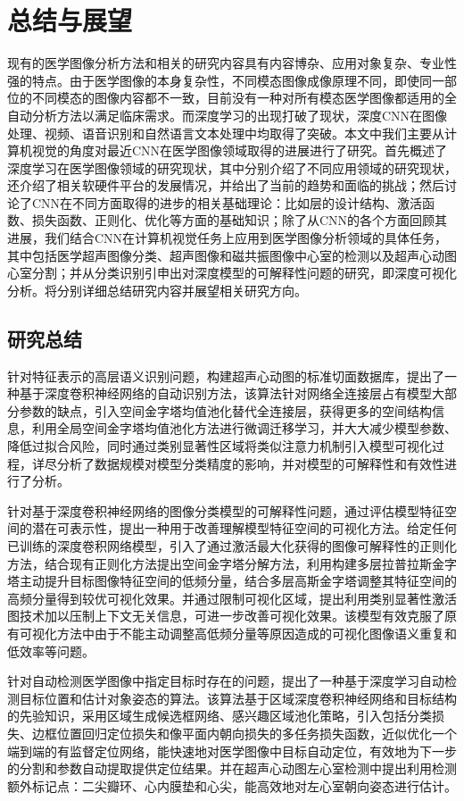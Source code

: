 \chapter{总结与展望}
\label{chap:Sum}

现有的医学图像分析方法和相关的研究内容具有内容博杂、应用对象复杂、专业性强的特点。由于医学图像的本身复杂性，不同模态图像成像原理不同，即使同一部位的不同模态的图像内容都不一致，目前没有一种对所有模态医学图像都适用的全自动分析方法以满足临床需求。而深度学习的出现打破了现状，深度CNN在图像处理、视频、语音识别和自然语言文本处理中均取得了突破。本文中我们主要从计算机视觉的角度对最近CNN在医学图像领域取得的进展进行了研究。首先概述了深度学习在医学图像领域的研究现状，其中分别介绍了不同应用领域的研究现状，还介绍了相关软硬件平台的发展情况，并给出了当前的趋势和面临的挑战；然后讨论了CNN在不同方面取得的进步的相关基础理论：比如层的设计结构、激活函数、损失函数、正则化、优化等方面的基础知识；除了从CNN的各个方面回顾其进展，我们结合CNN在计算机视觉任务上应用到医学图像分析领域的具体任务，其中包括医学超声图像分类、超声图像和磁共振图像中心室的检测以及超声心动图心室分割；并从分类识别引申出对深度模型的可解释性问题的研究，即深度可视化分析。将分别详细总结研究内容并展望相关研究方向。

\section{研究总结}

针对特征表示的高层语义识别问题，构建超声心动图的标准切面数据库，提出了一种基于深度卷积神经网络的自动识别方法，该算法针对网络全连接层占有模型大部分参数的缺点，引入空间金字塔均值池化替代全连接层，获得更多的空间结构信息，利用全局空间金字塔均值池化方法进行微调迁移学习，并大大减少模型参数、降低过拟合风险，同时通过类别显著性区域将类似注意力机制引入模型可视化过程，详尽分析了数据规模对模型分类精度的影响，并对模型的可解释性和有效性进行了分析。

针对基于深度卷积神经网络的图像分类模型的可解释性问题，通过评估模型特征空间的潜在可表示性，提出一种用于改善理解模型特征空间的可视化方法。给定任何已训练的深度卷积网络模型，引入了通过激活最大化获得的图像可解释性的正则化方法，结合现有正则化方法提出空间金字塔分解方法，利用构建多层拉普拉斯金字塔主动提升目标图像特征空间的低频分量，结合多层高斯金字塔调整其特征空间的高频分量得到较优可视化效果。并通过限制可视化区域，提出利用类别显著性激活图技术加以压制上下文无关信息，可进一步改善可视化效果。该模型有效克服了原有可视化方法中由于不能主动调整高低频分量等原因造成的可视化图像语义重复和低效率等问题。

针对自动检测医学图像中指定目标时存在的问题，提出了一种基于深度学习自动检测目标位置和估计对象姿态的算法。该算法基于区域深度卷积神经网络和目标结构的先验知识，采用区域生成候选框网络、感兴趣区域池化策略，引入包括分类损失、边框位置回归定位损失和像平面内朝向损失的多任务损失函数，近似优化一个端到端的有监督定位网络，能快速地对医学图像中目标自动定位，有效地为下一步的分割和参数自动提取提供定位结果。并在超声心动图左心室检测中提出利用检测额外标记点：二尖瓣环、心内膜垫和心尖，能高效地对左心室朝向姿态进行估计。

